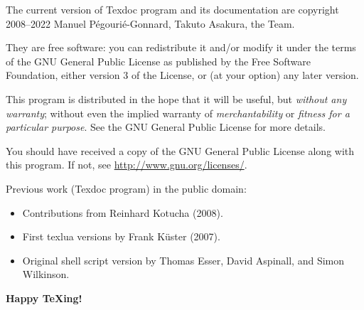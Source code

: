 \documentclass{texdoc-doc}
\begin{document}
The current version of Texdoc program and its documentation are copyright
2008--2022 Manuel Pégourié-Gonnard, Takuto Asakura, the {\TL} Team.

They are free software: you can redistribute it and/or modify it under the
terms of the GNU General Public License as published by the Free Software
Foundation, either version 3 of the License, or (at your option) any later
version.

This program is distributed in the hope that it will be useful, but
\emph{without any warranty}; without even the implied warranty of
\emph{merchantability} or \emph{fitness for a particular purpose}. See the
GNU General Public License for more details.

You should have received a copy of the GNU General Public License along with
this program. If not, see \url{http://www.gnu.org/licenses/}.

\bigskip

Previous work (Texdoc program) in the public domain:
%
\begin{itemize}
\item Contributions from Reinhard Kotucha (2008).
\item First texlua versions by Frank K\"uster (2007).
\item Original shell script version by Thomas Esser, David Aspinall, and Simon
  Wilkinson.
\end{itemize}

\bigskip

\begin{center}
\Large\bfseries
Happy {\TeX}ing!
\end{center}
\end{document}
